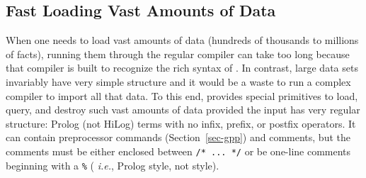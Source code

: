 
\subsection{Fast Loading Vast Amounts of Data}

When one needs to load vast amounts of data (hundreds of thousands to
millions of facts), running them through the regular \FLSYSTEM compiler can
take too long because that compiler is built to recognize the rich syntax
of \FLSYSTEM. In contrast, large data sets invariably have very simple
structure and it would be a waste to run a complex compiler to import all
that data. To this end, \FLSYSTEM provides special primitives to load,
query, and destroy such vast amounts of data provided the input has very
regular structure: Prolog (not HiLog)
terms with no infix, prefix, or postfix operators.
It can contain \FLSYSTEM preprocessor commands (Section~\ref{sec-gpp})
and comments, but the comments must be either enclosed between \texttt{/*
  ... */} or be one-line comments beginning with a \texttt{\%} ({\it
  i.e.}, Prolog style, not \FLSYSTEM style).   


